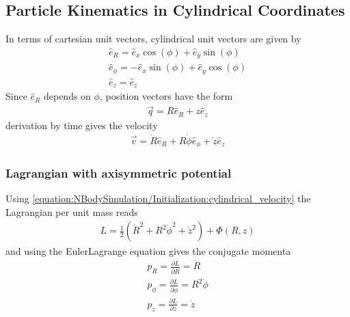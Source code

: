 \documentclass[letterpaper,10pt,english]{sphinxmanual}
\begin{document}
\subsection{Particle Kinematics in Cylindrical Coordinates}
\label{\detokenize{NBodySimulation/Initialization:particle-kinematics-in-cylindrical-coordinates}}
\sphinxAtStartPar
In terms of cartesian unit vectors, cylindrical unit vectors are given by
\begin{equation*}
\begin{split}\hat{e}_R = \hat{e}_x\cos(\phi) + \hat{e}_y\sin(\phi) \\
\hat{e}_\phi = -\hat{e}_x\sin(\phi) + \hat{e}_y\cos(\phi)\\
\hat{e}_z = \hat{e}_z\end{split}
\end{equation*}
\sphinxAtStartPar
Since \(\hat{e}_R\) depends on \(\phi\), position vectors have the form
\begin{equation*}
\begin{split}\vec{q} = R\hat{e}_R+z\hat{e}_z\end{split}
\end{equation*}
\sphinxAtStartPar
derivation by time gives the velocity
\begin{equation}\label{equation:NBodySimulation/Initialization:cylindrical_velocity}
\begin{split}\vec{v} = \dot{R}\hat{e}_R+R\dot{\phi}\hat{e}_\phi+\dot{z}\hat{e}_z\end{split}
\end{equation}

\subsubsection{Lagrangian with axisymmetric potential}
\label{\detokenize{NBodySimulation/Initialization:lagrangian-with-axisymmetric-potential}}
\sphinxAtStartPar
Using \eqref{equation:NBodySimulation/Initialization:cylindrical_velocity} the Lagrangian per unit mass reads
\begin{equation*}
\begin{split}L =\frac{1}{2}\left( \dot{R}^2+R^2\dot{\phi}^2+\dot{z}^2 \right)+\Phi\left(R,z\right)\end{split}
\end{equation*}
\sphinxAtStartPar
and using the Euler\textendash{}Lagrange equation gives the conjugate momenta
\begin{equation}\label{equation:NBodySimulation/Initialization:conjugate_momenta}
\begin{split}p_{R} = \frac{\partial L}{\partial \dot{R}} = \dot{R} \\
 p_{\phi} = \frac{\partial L}{\partial \dot{\phi}} = R^2\dot{\phi} \\
 p_{z} = \frac{\partial L}{\partial \dot{z}} = \dot{z} \\\end{split}
\end{equation}
\end{document}
